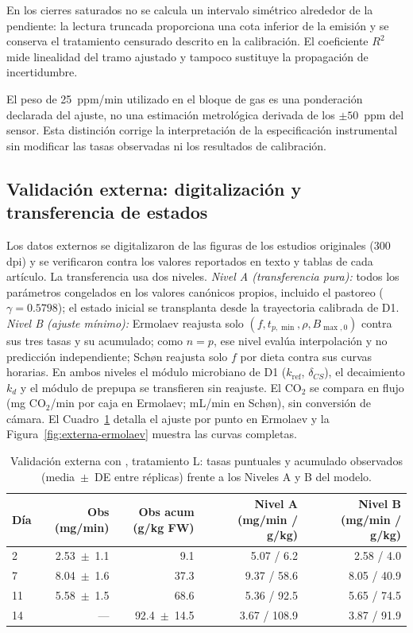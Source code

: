En los cierres saturados no se calcula un intervalo simétrico alrededor de la
pendiente: la lectura truncada proporciona una cota inferior de la emisión y
se conserva el tratamiento censurado descrito en la calibración. El coeficiente
$R^2$ mide linealidad del tramo ajustado y tampoco sustituye la propagación de
incertidumbre.

El peso de 25~ppm/min utilizado en el bloque de gas es una ponderación
declarada del ajuste, no una estimación metrológica derivada de los
$\pm 50$~ppm del sensor. Esta distinción corrige la interpretación de la
especificación instrumental sin modificar las tasas observadas ni los
resultados de calibración.

\subsection{Validación externa: digitalización y transferencia de estados}
\label{sup:externa}

Los datos externos se digitalizaron de las figuras de los estudios originales (300 dpi) y se verificaron contra los valores reportados en texto y tablas de cada artículo. La transferencia usa dos niveles. \emph{Nivel A (transferencia pura):} todos los parámetros congelados en los valores canónicos propios, incluido el pastoreo ($\gamma = 0.5798$); el estado inicial se transplanta desde la trayectoria calibrada de D1. \emph{Nivel B (ajuste mínimo):} Ermolaev reajusta solo $(f, t_{p,\min}, \rho, B_{\max,0})$ contra sus tres tasas y su acumulado; como $n=p$, ese nivel evalúa interpolación y no predicción independiente; Schøn reajusta solo $f$ por dieta contra sus curvas horarias. En ambos niveles el módulo microbiano de D1 ($k_{\mathrm{ref}}$, $\delta_{CS}$), el decaimiento $k_d$ y el módulo de prepupa se transfieren sin reajuste. El CO$_2$ se compara en flujo (mg CO$_2$/min por caja en Ermolaev; mL/min en Schøn), sin conversión de cámara. El Cuadro~\ref{tab:ermolaev-detalle} detalla el ajuste por punto en Ermolaev y la Figura~\ref{fig:externa-ermolaev} muestra las curvas completas.

\begin{table}[htbp]
  \centering
  \small
  \caption{Validación externa con \textcite{ermolaevGreenhouseGasEmissions2019}, tratamiento L: tasas puntuales y acumulado observados (media~$\pm$~DE entre réplicas) frente a los Niveles A y B del modelo.}
  \label{tab:ermolaev-detalle}
  \begin{tabular}{lrrrr}
    \toprule
    Día & Obs (mg/min) & Obs acum (g/kg FW) & Nivel A (mg/min / g/kg) & Nivel B (mg/min / g/kg) \\
    \midrule
    2  & 2.53~$\pm$~1.1 & 9.1  & 5.07 / 6.2   & 2.58 / 4.0 \\
    7  & 8.04~$\pm$~1.6 & 37.3 & 9.37 / 58.6  & 8.05 / 40.9 \\
    11 & 5.58~$\pm$~1.5 & 68.6 & 5.36 / 92.5  & 5.65 / 74.5 \\
    14 & ---            & 92.4~$\pm$~14.5 & 3.67 / 108.9 & 3.87 / 91.9 \\
    \bottomrule
  \end{tabular}
\end{table}

